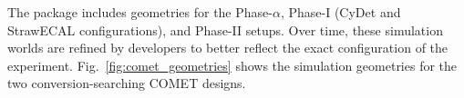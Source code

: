 The \SimG package includes geometries for the Phase-$\alpha$, Phase-I (CyDet and StrawECAL configurations), and Phase-II setups. Over time, these simulation worlds are refined by developers to better reflect the exact configuration of the experiment. 
Fig.~\ref{fig:comet_geometries} shows the simulation geometries for the two conversion-searching COMET designs.

\begin{figure}
    \centering
    \captionsetup[subfigure]{justification=centering}
    \noindent{}
    

\end{figure}
